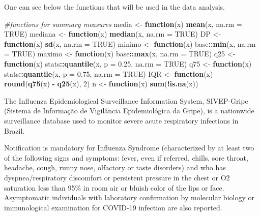 \documentclass[
]{article}
\newenvironment{Shaded}{\begin{snugshade}}{\end{snugshade}}
\newcommand{\CommentTok}[1]{\textcolor[rgb]{0.56,0.35,0.01}{\textit{#1}}}
\newcommand{\ControlFlowTok}[1]{\textcolor[rgb]{0.13,0.29,0.53}{\textbf{#1}}}
\newcommand{\DataTypeTok}[1]{\textcolor[rgb]{0.13,0.29,0.53}{#1}}
\newcommand{\DecValTok}[1]{\textcolor[rgb]{0.00,0.00,0.81}{#1}}
\newcommand{\FloatTok}[1]{\textcolor[rgb]{0.00,0.00,0.81}{#1}}
\newcommand{\KeywordTok}[1]{\textcolor[rgb]{0.13,0.29,0.53}{\textbf{#1}}}
\newcommand{\NormalTok}[1]{#1}
\newcommand{\OperatorTok}[1]{\textcolor[rgb]{0.81,0.36,0.00}{\textbf{#1}}}
\newcommand{\OtherTok}[1]{\textcolor[rgb]{0.56,0.35,0.01}{#1}}
\newcommand{\StringTok}[1]{\textcolor[rgb]{0.31,0.60,0.02}{#1}}
\begin{document}
One can see below the functions that will be used in the data analysis.

\begin{Shaded}
\begin{Highlighting}[]
\CommentTok{#functions for summary measures}
\NormalTok{media <-}\StringTok{ }\ControlFlowTok{function}\NormalTok{(x)}
  \KeywordTok{mean}\NormalTok{(x, }\DataTypeTok{na.rm =} \OtherTok{TRUE}\NormalTok{)}
\NormalTok{mediana <-}\StringTok{ }\ControlFlowTok{function}\NormalTok{(x)}
  \KeywordTok{median}\NormalTok{(x, }\DataTypeTok{na.rm =} \OtherTok{TRUE}\NormalTok{)}
\NormalTok{DP <-}\StringTok{ }\ControlFlowTok{function}\NormalTok{(x)}
  \KeywordTok{sd}\NormalTok{(x, }\DataTypeTok{na.rm =} \OtherTok{TRUE}\NormalTok{)}
\NormalTok{minimo <-}\StringTok{ }\ControlFlowTok{function}\NormalTok{(x)}
\NormalTok{  base}\OperatorTok{::}\KeywordTok{min}\NormalTok{(x, }\DataTypeTok{na.rm =} \OtherTok{TRUE}\NormalTok{)}
\NormalTok{maximo <-}\StringTok{ }\ControlFlowTok{function}\NormalTok{(x)}
\NormalTok{  base}\OperatorTok{::}\KeywordTok{max}\NormalTok{(x, }\DataTypeTok{na.rm =} \OtherTok{TRUE}\NormalTok{)}
\NormalTok{q25 <-}\StringTok{ }\ControlFlowTok{function}\NormalTok{(x)}
\NormalTok{  stats}\OperatorTok{::}\KeywordTok{quantile}\NormalTok{(x, }\DataTypeTok{p =} \FloatTok{0.25}\NormalTok{, }\DataTypeTok{na.rm =} \OtherTok{TRUE}\NormalTok{)}
\NormalTok{q75 <-}\StringTok{ }\ControlFlowTok{function}\NormalTok{(x)}
\NormalTok{  stats}\OperatorTok{::}\KeywordTok{quantile}\NormalTok{(x, }\DataTypeTok{p =} \FloatTok{0.75}\NormalTok{, }\DataTypeTok{na.rm =} \OtherTok{TRUE}\NormalTok{)}
\NormalTok{IQR <-}\StringTok{ }\ControlFlowTok{function}\NormalTok{(x)}
  \KeywordTok{round}\NormalTok{(}\KeywordTok{q75}\NormalTok{(x) }\OperatorTok{-}\StringTok{ }\KeywordTok{q25}\NormalTok{(x), }\DecValTok{2}\NormalTok{)}
\NormalTok{n <-}\StringTok{ }\ControlFlowTok{function}\NormalTok{(x)}
  \KeywordTok{sum}\NormalTok{(}\OperatorTok{!}\KeywordTok{is.na}\NormalTok{(x))}
\end{Highlighting}
\end{Shaded}

The Influenza Epidemiological Surveillance Information System,
SIVEP-Gripe (Sistema de Informação de Vigilância Epidemiológica da
Gripe), is a nationwide surveillance database used to monitor severe
acute respiratory infections in Brazil.

Notification is mandatory for Influenza Syndrome (characterized by at
least two of the following signs and symptoms: fever, even if referred,
chills, sore throat, headache, cough, runny nose, olfactory or taste
disorders) and who has dyspnea/respiratory discomfort or persistent
pressure in the chest or O2 saturation less than 95\% in room air or
bluish color of the lips or face. Asymptomatic individuals with
laboratory confirmation by molecular biology or immunological
examination for COVID-19 infection are also reported.
\end{document}

